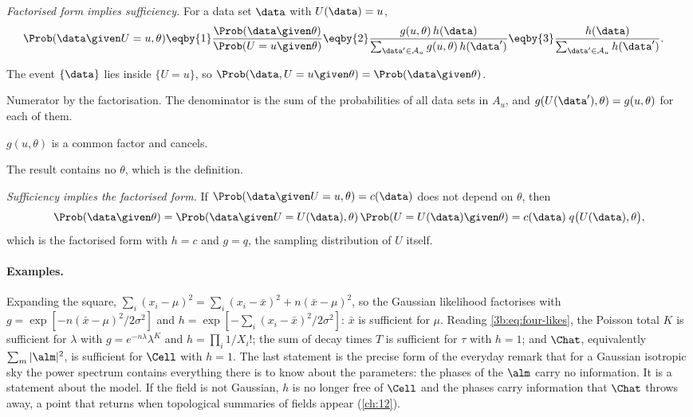 \emph{Factorised form implies sufficiency.} For a data set $\data$ with
$U(\data)=u$,
\begin{align}
  \Prob(\data\given U=u,\theta)
  &\eqby{1}\frac{\Prob(\data\given\theta)}{\Prob(U=u\given\theta)}
   \eqby{2}\frac{g(u,\theta)\,h(\data)}{\sum_{\data'\in\mathcal A_u}g(u,\theta)\,h(\data')}
   \eqby{3}\frac{h(\data)}{\sum_{\data'\in\mathcal A_u}h(\data')} .
  \label{3b:eq:suff-forward}
\end{align}
\begin{explain}
  \item The event $\{\data\}$ lies inside $\{U=u\}$, so
        $\Prob(\data,U=u\given\theta)=\Prob(\data\given\theta)$.
  \item Numerator by the factorisation. The denominator is the sum of the
        probabilities of all data sets in $A_u$, and $g(U(\data'),\theta)=g(u,\theta)$
        for each of them.
  \item $g(u,\theta)$ is a common factor and cancels.
\end{explain}
The result contains no $\theta$, which is the definition.

\emph{Sufficiency implies the factorised form.} If
$\Prob(\data\given U=u,\theta)=c(\data)$ does not depend on $\theta$, then
\[
  \Prob(\data\given\theta)
  =\Prob(\data\given U=U(\data),\theta)\,\Prob(U=U(\data)\given\theta)
  =c(\data)\;q\bigl(U(\data),\theta\bigr),
\]
which is the factorised form with $h=c$ and $g=q$, the sampling distribution
of $U$ itself.

\paragraph{Examples.}
Expanding the square, $\sum_i(x_i-\mu)^2=\sum_i(x_i-\bar x)^2+n(\bar x-\mu)^2$,
so the Gaussian likelihood factorises with
$g=\exp[-n(\bar x-\mu)^2/2\sigma^2]$ and $h=\exp[-\sum_i(x_i-\bar x)^2/2\sigma^2]$:
$\bar x$ is sufficient for $\mu$. Reading \eqref{3b:eq:four-likes}, the Poisson
total $K$ is sufficient for $\lambda$ with $g=e^{-n\lambda}\lambda^K$ and
$h=\prod_i1/X_i!$; the sum of decay times $T$ is sufficient for $\tau$ with
$h=1$; and $\Chat$, equivalently $\sum_m|\alm|^2$, is sufficient for $\Cell$
with $h=1$. The last statement is the precise form of the everyday remark
that for a Gaussian isotropic sky the power spectrum contains everything
there is to know about the parameters: the phases of the $\alm$ carry no
information. It is a statement about the model. If the field is not
Gaussian, $h$ is no longer free of $\Cell$ and the phases carry information
that $\Chat$ throws away, a point that returns when topological summaries of
fields appear (\cref{ch:12}).

